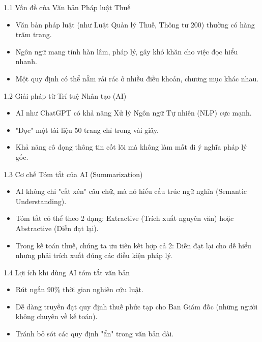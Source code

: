 \documentclass[aspectratio=169]{beamer}
\begin{document}
\begin{frame}{1.1 Vấn đề của Văn bản Pháp luật Thuế}
    \begin{itemize}
        \item Văn bản pháp luật (như Luật Quản lý Thuế, Thông tư 200) thường có hàng trăm trang.
        \item Ngôn ngữ mang tính hàn lâm, pháp lý, gây khó khăn cho việc đọc hiểu nhanh.
        \item Một quy định có thể nằm rải rác ở nhiều điều khoản, chương mục khác nhau.
    \end{itemize}
\end{frame}


\begin{frame}{1.2 Giải pháp từ Trí tuệ Nhân tạo (AI)}
    \begin{itemize}
        \item AI như ChatGPT có khả năng Xử lý Ngôn ngữ Tự nhiên (NLP) cực mạnh.
        \item "Đọc" một tài liệu 50 trang chỉ trong vài giây.
        \item Khả năng cô đọng thông tin cốt lõi mà không làm mất đi ý nghĩa pháp lý gốc.
    \end{itemize}
\end{frame}


\begin{frame}{1.3 Cơ chế Tóm tắt của AI (Summarization)}
    \begin{itemize}
        \item AI không chỉ "cắt xén" câu chữ, mà nó hiểu cấu trúc ngữ nghĩa (Semantic Understanding).
        \item Tóm tắt có thể theo 2 dạng: Extractive (Trích xuất nguyên văn) hoặc Abstractive (Diễn đạt lại).
        \item Trong kế toán thuế, chúng ta ưu tiên kết hợp cả 2: Diễn đạt lại cho dễ hiểu nhưng phải trích xuất đúng các điều kiện pháp lý.
    \end{itemize}
\end{frame}


\begin{frame}{1.4 Lợi ích khi dùng AI tóm tắt văn bản}
    \begin{itemize}
        \item Rút ngắn 90\% thời gian nghiên cứu luật.
        \item Dễ dàng truyền đạt quy định thuế phức tạp cho Ban Giám đốc (những người không chuyên về kế toán).
        \item Tránh bỏ sót các quy định "ẩn" trong văn bản dài.
    \end{itemize}
\end{frame}
\end{document}
